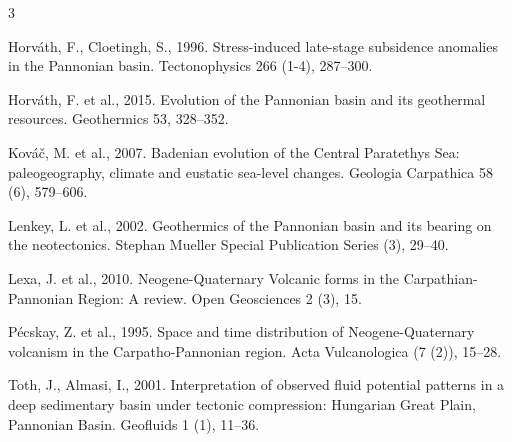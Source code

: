 \documentclass[11.5pt,twoside]{report}
\newenvironment{localsize}[1] %
{%
	\clearpage
	\let\orignewcommand\newcommand
	\let\newcommand\renewcommand
	\makeatletter
	\makeatother
	\let\newcommand\orignewcommand
}
{%
	\clearpage
}
\begin{document}
\begin{multicols}{3}
\begin{localsize}{10}
Horváth, F., Cloetingh, S., 1996. Stress-induced late-stage subsidence anomalies in the Pannonian basin. Tectonophysics 266 (1-4), 287–300. 

Horváth, F. et al., 2015. Evolution of the Pannonian basin and its geothermal resources. Geothermics 53, 328–352. 

Kováč, M. et al., 2007. Badenian evolution of the Central Paratethys Sea: paleogeography, climate and eustatic sea-level changes. Geologia Carpathica 58 (6), 579–606.

Lenkey, L. et al., 2002. Geothermics of the Pannonian basin and its bearing on the neotectonics. Stephan Mueller Special Publication Series (3), 29–40.

Lexa, J. et al., 2010. Neogene-Quaternary Volcanic forms in the Carpathian-Pannonian Region: A review. Open Geosciences 2 (3), 15.

Pécskay, Z. et al., 1995. Space and time distribution of Neogene-Quaternary volcanism in the Carpatho-Pannonian region. Acta Vulcanologica (7 (2)), 15–28.

Toth, J., Almasi, I., 2001. Interpretation of observed fluid potential patterns in a deep sedimentary basin under tectonic compression: Hungarian Great Plain, Pannonian Basin. Geofluids 1 (1), 11–36.

\end{localsize}

\end{multicols}
\end{document}
